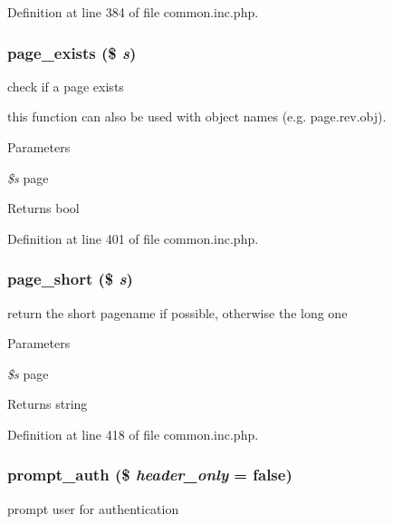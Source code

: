 Definition at line 384 of file common.inc.php.

\hypertarget{common_8inc_8php_aa71868111dd5b8af98df9cc9c968e523}{
\subsubsection[{page\_\-exists}]{\setlength{\rightskip}{0pt plus 5cm}page\_\-exists (\$ {\em s})}}
\label{common_8inc_8php_aa71868111dd5b8af98df9cc9c968e523}
check if a page exists

this function can also be used with object names (e.g. page.rev.obj). 
\begin{DoxyParams}{Parameters}
\item[{\em \$s}]page \end{DoxyParams}
\begin{DoxyReturn}{Returns}
bool 
\end{DoxyReturn}


Definition at line 401 of file common.inc.php.

\hypertarget{common_8inc_8php_ada968adfb989aa09adaf29867208f1ab}{
\subsubsection[{page\_\-short}]{\setlength{\rightskip}{0pt plus 5cm}page\_\-short (\$ {\em s})}}
\label{common_8inc_8php_ada968adfb989aa09adaf29867208f1ab}
return the short pagename if possible, otherwise the long one


\begin{DoxyParams}{Parameters}
\item[{\em \$s}]page \end{DoxyParams}
\begin{DoxyReturn}{Returns}
string 
\end{DoxyReturn}


Definition at line 418 of file common.inc.php.

\hypertarget{common_8inc_8php_a80c23c9d8ac02159151d6368506b1b54}{
\subsubsection[{prompt\_\-auth}]{\setlength{\rightskip}{0pt plus 5cm}prompt\_\-auth (\$ {\em header\_\-only} = {\ttfamily false})}}
\label{common_8inc_8php_a80c23c9d8ac02159151d6368506b1b54}
prompt user for authentication


